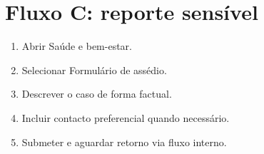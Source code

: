\section{Fluxo C: reporte sensível}
\begin{enumerate}
  \item Abrir Saúde e bem-estar.
  \item Selecionar Formulário de assédio.
  \item Descrever o caso de forma factual.
  \item Incluir contacto preferencial quando necessário.
  \item Submeter e aguardar retorno via fluxo interno.
\end{enumerate}
